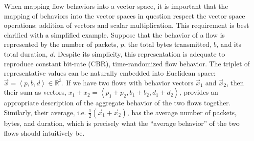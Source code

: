 \documentclass[conference]{IEEEtran}
\newcommand{\caps}[1]{{\small{#1}}}
\newcommand{\R}{\mathbb{R}}
\newcommand{\seq}[1]{\left<#1\right>}
\begin{document}
When mapping flow behaviors into a vector space, it is important that the mapping of behaviors into the vector spaces in question respect the vector space operations: addition of vectors and scalar multiplication. This requirement is best clarified with a simplified example. Suppose that the behavior of a flow is represented by the number of packets, $p$, the total bytes transmitted, $b$, and its total duration, $d$. Despite its simplicity, this representation is adequate to reproduce constant bit-rate (\caps{CBR}), time-randomized flow behavior. The triplet of representative values can be naturally embedded into Euclidean space: $\vec{x}=\seq{p,b,d}\in\R^3$. If we have two flows with behavior vectors $\vec{x}_1$ and $\vec{x}_2$, then their sum as vectors, $x_1+x_2=\seq{p_1+p_2,b_1+b_2,d_1+d_2}$, provides an appropriate description of the aggregate behavior of the two flows together. Similarly, their average, i.e. $\frac{1}{2}(\vec{x}_1+\vec{x}_2)$, has the average number of packets, bytes, and duration, which is precisely what the ``average behavior'' of the two flows should intuitively be.


\end{document}
